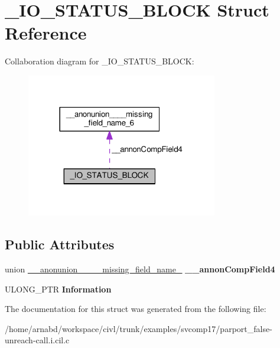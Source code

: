 \hypertarget{struct__IO__STATUS__BLOCK}{}\section{\+\_\+\+I\+O\+\_\+\+S\+T\+A\+T\+U\+S\+\_\+\+B\+L\+O\+C\+K Struct Reference}
\label{struct__IO__STATUS__BLOCK}


Collaboration diagram for \+\_\+\+I\+O\+\_\+\+S\+T\+A\+T\+U\+S\+\_\+\+B\+L\+O\+C\+K\+:
\nopagebreak
\begin{figure}[H]
\begin{center}
\leavevmode
\includegraphics[width=236pt]{struct__IO__STATUS__BLOCK__coll__graph}
\end{center}
\end{figure}
\subsection*{Public Attributes}
\begin{DoxyCompactItemize}
\item 
\hypertarget{struct__IO__STATUS__BLOCK_a2a4e3bc9dc4d309a28e3ec384892f43f}{}union \hyperlink{union____anonunion________missing__field__name__6}{\+\_\+\+\_\+anonunion\+\_\+\+\_\+\+\_\+\+\_\+missing\+\_\+field\+\_\+name\+\_} {\bfseries \+\_\+\+\_\+annon\+Comp\+Field4}\label{struct__IO__STATUS__BLOCK_a2a4e3bc9dc4d309a28e3ec384892f43f}

\item 
\hypertarget{struct__IO__STATUS__BLOCK_aa521d86b8e01d4e298bc4e9fb77cecf3}{}U\+L\+O\+N\+G\+\_\+\+P\+T\+R {\bfseries Information}\label{struct__IO__STATUS__BLOCK_aa521d86b8e01d4e298bc4e9fb77cecf3}

\end{DoxyCompactItemize}


The documentation for this struct was generated from the following file\+:\begin{DoxyCompactItemize}
\item 
/home/arnabd/workspace/civl/trunk/examples/svcomp17/parport\+\_\+false-\/unreach-\/call.\+i.\+cil.\+c\end{DoxyCompactItemize}
